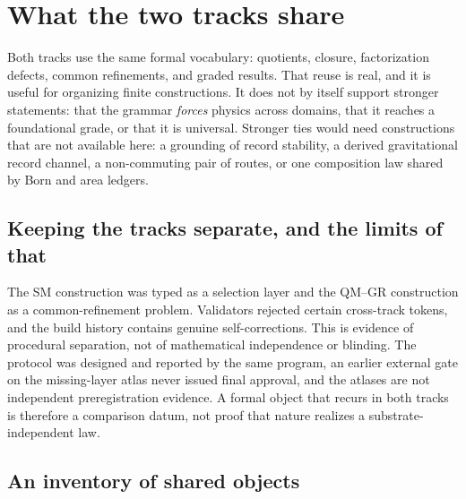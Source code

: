 \section{What the two tracks share}\label{cross-track-ties-and-the-one-grammar-thesis}

Both tracks use the same formal vocabulary: quotients, closure, factorization defects, common refinements, and graded
results. That reuse is real, and it is useful for organizing finite constructions. It does not by itself support
stronger statements: that the grammar \emph{forces} physics across domains, that it reaches a foundational grade, or
that it is universal. Stronger ties would need constructions that are not available here: a grounding of record
stability, a derived gravitational record channel, a non-commuting pair of routes, or one composition law shared by
Born and area ledgers.

\subsection{Keeping the tracks separate, and the limits of that}\label{why-the-ties-are-non-trivial-the-anti-contamination-guard}

The SM construction was typed as a selection layer and the QM--GR construction as a common-refinement problem.
Validators rejected certain cross-track tokens, and the build history contains genuine self-corrections. This is
evidence of procedural separation, not of mathematical independence or blinding. The protocol was designed and
reported by the same program, an earlier external gate on the missing-layer atlas never issued final approval, and
the atlases are not independent preregistration evidence. A formal object that recurs in both tracks is therefore a
comparison datum, not proof that nature realizes a substrate-independent law.

\subsection{An inventory of shared objects}\label{the-cross-track-ties}

